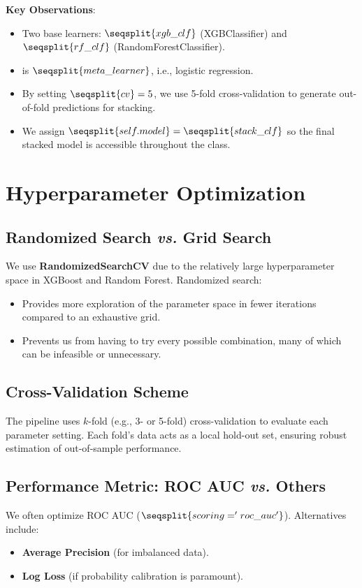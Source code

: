 \documentclass[12pt]{article}
\begin{document}
\noindent
\textbf{Key Observations}:
\begin{itemize}
    \item Two base learners: \(\seqsplit{xgb\_clf}\) (XGBClassifier) and \(\seqsplit{rf\_clf}\) (RandomForestClassifier).
    \item {} is \(\seqsplit{meta\_learner}\), i.e., logistic regression.
    \item By setting \(\seqsplit{cv}=5\), we use 5-fold cross-validation to generate out-of-fold predictions for stacking.
    \item We assign \(\seqsplit{self.model} = \seqsplit{stack\_clf}\) so the final stacked model is accessible throughout the class.
\end{itemize}

\section{Hyperparameter Optimization}

\subsection{Randomized Search \emph{vs.} Grid Search}
We use \textbf{RandomizedSearchCV} due to the relatively large hyperparameter space in XGBoost and Random Forest. Randomized search:
\begin{itemize}[noitemsep]
    \item Provides more exploration of the parameter space in fewer iterations compared to an exhaustive grid.
    \item Prevents us from having to try every possible combination, many of which can be infeasible or unnecessary.
\end{itemize}

\subsection{Cross-Validation Scheme}
The pipeline uses \(k\)-fold (e.g., 3- or 5-fold) cross-validation to evaluate each parameter setting. Each fold’s data acts as a local hold-out set, ensuring robust estimation of out-of-sample performance.

\subsection{Performance Metric: ROC AUC \emph{vs.} Others}
We often optimize ROC AUC (\(\seqsplit{scoring='roc\_auc'}\)). Alternatives include:
\begin{itemize}[noitemsep]
    \item \textbf{Average Precision} (for imbalanced data).
    \item \textbf{Log Loss} (if probability calibration is paramount).
\end{itemize}
\end{document}
